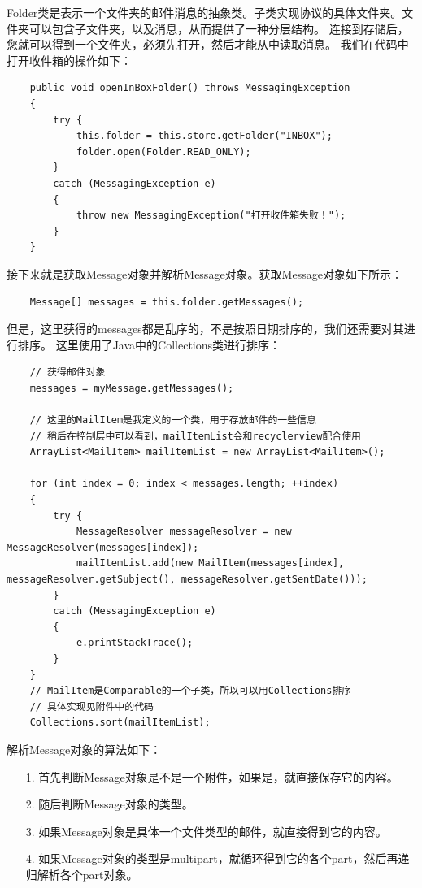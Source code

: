 \documentclass[a4paper,left=2.5cm,right=2.5cm,11pt]{article}
\begin{document}
	Folder类是表示一个文件夹的邮件消息的抽象类。子类实现协议的具体文件夹。文件夹可以包含子文件夹，以及消息，从而提供了一种分层结构。
	连接到存储后，您就可以得到一个文件夹，必须先打开，然后才能从中读取消息。
	我们在代码中打开收件箱的操作如下：
	\begin{lstlisting}
	public void openInBoxFolder() throws MessagingException
    {
        try {
            this.folder = this.store.getFolder("INBOX");
            folder.open(Folder.READ_ONLY);
        }
        catch (MessagingException e)
        {
            throw new MessagingException("打开收件箱失败！");
        }
    }
	\end{lstlisting}

	接下来就是获取Message对象并解析Message对象。获取Message对象如下所示：
	\begin{lstlisting}
	Message[] messages = this.folder.getMessages();
	\end{lstlisting}

	但是，这里获得的messages都是乱序的，不是按照日期排序的，我们还需要对其进行排序。
	这里使用了Java中的Collections类进行排序：
	\begin{lstlisting}
	// 获得邮件对象
	messages = myMessage.getMessages();
	
	// 这里的MailItem是我定义的一个类，用于存放邮件的一些信息
	// 稍后在控制层中可以看到，mailItemList会和recyclerview配合使用
	ArrayList<MailItem> mailItemList = new ArrayList<MailItem>();

	for (int index = 0; index < messages.length; ++index)
	{
		try {
			MessageResolver messageResolver = new MessageResolver(messages[index]);
			mailItemList.add(new MailItem(messages[index], messageResolver.getSubject(), messageResolver.getSentDate()));
		}
		catch (MessagingException e)
		{
			e.printStackTrace();
		}
	}
	// MailItem是Comparable的一个子类，所以可以用Collections排序
	// 具体实现见附件中的代码
	Collections.sort(mailItemList);
	\end{lstlisting}

	解析Message对象的算法如下：
	\begin{itemize}
		\item[1.] 首先判断Message对象是不是一个附件，如果是，就直接保存它的内容。
		\item[2.] 随后判断Message对象的类型。
		\item[3.] 如果Message对象是具体一个文件类型的邮件，就直接得到它的内容。
		\item[4.] 如果Message对象的类型是multipart，就循环得到它的各个part，然后再递归解析各个part对象。
	\end{itemize}
\end{document}
